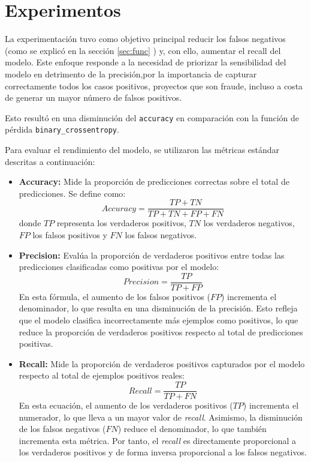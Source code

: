 \section{Experimentos}

 La experimentación tuvo como objetivo principal reducir los falsos negativos (como se explicó en la sección \ref{sec:func} ) y, con ello, aumentar el recall del modelo. Este enfoque responde a la necesidad de priorizar la sensibilidad del modelo en detrimento de la precisión,por la importancia de capturar correctamente todos los casos positivos, proyectos que son fraude, incluso a costa de generar un mayor número de falsos positivos.

 Esto resultó en una disminución del \texttt{accuracy} en comparación con la función de pérdida \texttt{binary\_crossentropy}.


Para evaluar el rendimiento del modelo, se utilizaron las métricas estándar descritas a continuación:

\begin{itemize}
    \item \textbf{Accuracy:} Mide la proporción de predicciones correctas sobre el total de predicciones. Se define como:
    \[
    Accuracy = \frac{TP + TN}{TP + TN + FP + FN}
    \]
    donde $TP$ representa los verdaderos positivos, $TN$ los verdaderos negativos, $FP$ los falsos positivos y $FN$ los falsos negativos.

    \item \textbf{Precision:} Evalúa la proporción de verdaderos positivos entre todas las predicciones clasificadas como positivas por el modelo:
    \[
    Precision = \frac{TP}{TP + FP}
    \]
    En esta fórmula, el aumento de los falsos positivos ($FP$) incrementa el denominador, lo que resulta en una disminución de la precisión. Esto refleja que el modelo clasifica incorrectamente más ejemplos como positivos, lo que reduce la proporción de verdaderos positivos respecto al total de predicciones positivas.

    \item \textbf{Recall:} Mide la proporción de verdaderos positivos capturados por el modelo respecto al total de ejemplos positivos reales:
    \[
    Recall = \frac{TP}{TP + FN}
    \]
    En esta ecuación, el aumento de los verdaderos positivos ($TP$) incrementa el numerador, lo que lleva a un mayor valor de \textit{recall}. Asimismo, la disminución de los falsos negativos ($FN$) reduce el denominador, lo que también incrementa esta métrica. Por tanto, el \textit{recall} es directamente proporcional a los verdaderos positivos y de forma inversa proporcional a los falsos negativos.

\end{itemize}

